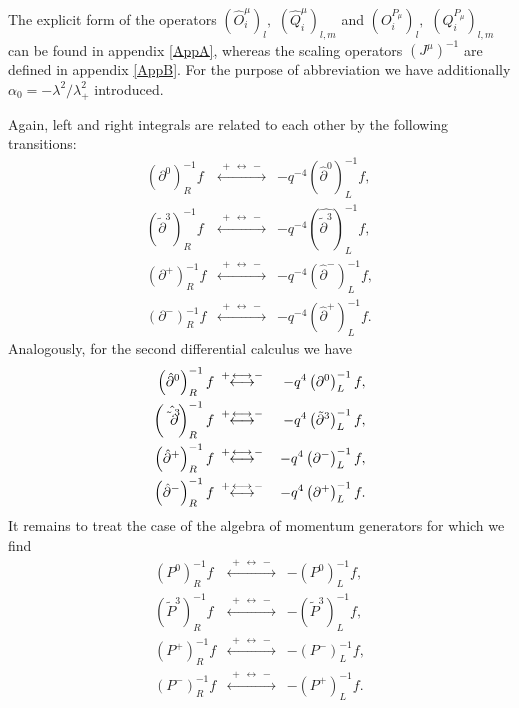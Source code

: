 \documentclass[a4paper,11pt,oneside]{article}
\newcommand{\underleftrightarrow}{\stackrel{\;+\,\longleftrightarrow\,-\;}{\longleftrightarrow}}
\begin{document}
The explicit form of the operators $\left( \hat{O}_{i}^{\mu}\right) _{l},$ $%
\left( \hat{Q}_{i}^{\mu}\right) _{l,m}$ and $\left( O_{i}^{P_{\mu}}\right) _{l},$
$\left( Q_{i}^{P_{\mu}}\right) _{l,m}$ can be found in appendix \ref{AppA},
whereas the scaling operators $\left( J^{\mu}\right) ^{-1}$ are defined in
appendix \ref{AppB}. For the purpose of abbreviation we have additionally
$\alpha _{0}=-\lambda ^{2}/\lambda _{+}^{2}$ introduced.

Again, left and right integrals are related to each other by the following
transitions: 
\begin{eqnarray}
\left( \partial ^{0}\right) _{R}^{-1}f&\underleftrightarrow&-q^{-4}\left( \hat{\partial}^{0}\right)
_{L}^{-1}f, \\
\left( \tilde{\partial}^{3}\right) _{R}^{-1}f&\underleftrightarrow&-q^{-4}\left( \hat{\tilde{\partial}^{3}}%
\right) _{L}^{-1}f,  \nonumber \\
\left( \partial ^{+}\right) _{R}^{-1}f&\underleftrightarrow&-q^{-4}\left( \hat{\partial}^{-}\right)
_{L}^{-1}f,  \nonumber \\
\left( \partial ^{-}\right) _{R}^{-1}f&\underleftrightarrow&-q^{-4}\left( \hat{\partial}^{+}\right)
_{L}^{-1}f.  \nonumber
\end{eqnarray}
Analogously, for the second differential calculus we have 
\begin{eqnarray}
\left( \hat{\partial}^{0}\right) _{R}^{-1}f&\underleftrightarrow&-q^{4}\left( \partial ^{0}\right) _{L}^{-1}f,\\
\left( \hat{\tilde{\partial}^{3}}\right) _{R}^{-1}f&\underleftrightarrow&-q^{4}\left( \tilde{%
\partial}^{3}\right) _{L}^{-1}f,  \nonumber \\
\left( \hat{\partial}^{+}\right) _{R}^{-1}f&\underleftrightarrow&-q^{4}\left( \partial ^{-}\right) _{L}^{-1}f,
\nonumber \\
\left( \hat{\partial}^{-}\right) _{R}^{-1}f&\underleftrightarrow&-q^{4}\left( \partial ^{+}\right) _{L}^{-1}f.
\nonumber
\end{eqnarray}
It remains to treat the case of the algebra of momentum generators for which
we find 
\begin{eqnarray}
\left( P^{0}\right) _{R}^{-1}f&\underleftrightarrow&-\left( P^{0}\right) _{L}^{-1}f, \\
\left( \tilde{P}^{3}\right) _{R}^{-1}f&\underleftrightarrow&-\left( \tilde{P}^{3}\right) _{L}^{-1}f, 
\nonumber \\
\left( P^{+}\right) _{R}^{-1}f&\underleftrightarrow&-\left( P^{-}\right) _{L}^{-1}f,  \nonumber \\
\left( P^{-}\right) _{R}^{-1}f&\underleftrightarrow&-\left( P^{+}\right) _{L}^{-1}f.  \nonumber
\end{eqnarray}
\end{document}
